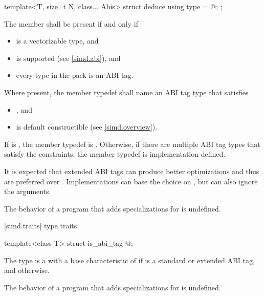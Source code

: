\begin{wgText}
\begin{itemdecl}
template<T, size_t N, class... Abis> struct deduce { using type = @\seebelow@; };
\end{itemdecl}

\begin{itemdescr}
\pnum
The member  shall be present if and only if
\begin{itemize}
  \item {} is a vectorizable type, and
  \item {} is supported (see \ref{simd.abi}), and
  \item every type in the  pack is an ABI tag.
\end{itemize}

\pnum
Where present, the member typedef  shall name an ABI tag type that satisfies
\begin{itemize}
  \item {}, and
  \item {} is default constructible (see \ref{simd.overview}).
\end{itemize}
If  is , the member typedef  is . Otherwise, if there are multiple ABI tag types that satisfy the constraints, the member typedef  is implementation-defined. \begin{note}It is expected that extended ABI tags can produce better optimizations and thus are preferred over .
Implementations can base the choice on , but can also ignore the  arguments.
\end{note}

\pnum
The behavior of a program that adds specializations for  is undefined.
\end{itemdescr}

[simd.traits]{ type traits}

\begin{itemdecl}
template<class T> struct is_abi_tag { @\seebelow@ };
\end{itemdecl}

\begin{itemdescr}
\pnum
The type  is a  with a base characteristic of  if  is a standard or extended ABI tag, and  otherwise.

\pnum
The behavior of a program that adds specializations for  is undefined.
\end{itemdescr}


\end{wgText}
